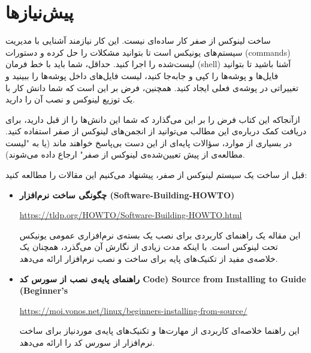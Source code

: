 \documentclass{book}
\begin{document}
\section{پیش‌نیازها}

ساخت لینوکس از صفر کار ساده‌ای نیست. این کار نیازمند آشنایی با مدیریت سیستم‌های یونیکس است تا بتوانید مشکلات را حل کرده و دستورات (commands) لیست‌شده را اجرا کنید. حداقل، شما باید با خط فرمان (shell) آشنا باشید تا بتوانید فایل‌ها و پوشه‌ها را کپی و جابه‌جا کنید، لیست فایل‌های داخل پوشه‌ها را ببینید و تغییراتی در پوشه‌ی فعلی ایجاد کنید. همچنین، فرض بر این است که شما دانش کار با یک توزیع لینوکس و نصب آن را دارید.
\newline

\par
ازآنجاکه این کتاب فرض را بر این می‌گذارد که شما این دانش‌ها را از قبل دارید، برای دریافت کمک درباره‌ی این مطالب می‌توانید از انجمن‌های لینوکس از صفر استفاده کنید. در بسیاری از موارد، سؤالات پایه‌ای از این دست بی‌پاسخ خواهند ماند (یا به "لیست مطالعه‌ی از پیش تعیین‌شده‌ی لینوکس از صفر" ارجاع داده می‌شوند).
\newline

\par
قبل از ساخت یک سیستم لینوکس از صفر، پیشنهاد می‌کنیم این مقالات را مطالعه کنید:

\begin{itemize}
	\item \textbf{چگونگی ساخت نرم‌افزار \scriptsize (Software-Building-HOWTO)}  \

	\begin{center}
		\small \url{https://tldp.org/HOWTO/Software-Building-HOWTO.html}
	\end{center}

    این مقاله یک راهنمای کاربردی برای نصب یک بسته‌ی نرم‌افزاری عمومی یونیکس تحت لینوکس است. با اینکه مدت زیادی از نگارش آن می‌گذرد، همچنان یک خلاصه‌ی مفید از تکنیک‌های پایه برای ساخت و نصب نرم‌افزار ارائه می‌دهد.
    
	\item \textbf{راهنمای پایه‌ی نصب از سورس کد \scriptsize Code) Source from Installing to Guide (Beginner’s}  
    
	\begin{center}
		\small \url{https://moi.vonos.net/linux/beginners-installing-from-source/}
	\end{center}
	
    این راهنما خلاصه‌ای کاربردی از مهارت‌ها و تکنیک‌های پایه‌ی موردنیاز برای ساخت نرم‌افزار از سورس کد را ارائه می‌دهد.
    
\end{itemize}
\end{document}
